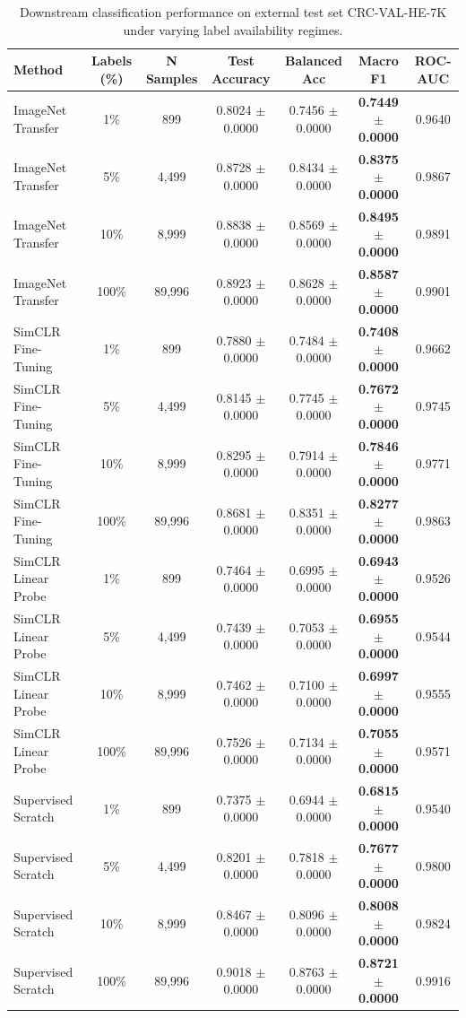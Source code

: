 \begin{table}[t]
\centering
\small
\caption{Downstream classification performance on external test set CRC-VAL-HE-7K under varying label availability regimes.}
\label{tab:downstream_results}
\begin{tabular}{lcccccc}
\toprule
\textbf{Method} & \textbf{Labels (\%)} & \textbf{N Samples} & \textbf{Test Accuracy} & \textbf{Balanced Acc} & \textbf{Macro F1} & \textbf{ROC-AUC} \\
\midrule
ImageNet Transfer & 1\% & 899 & 0.8024 $\pm$ 0.0000 & 0.7456 $\pm$ 0.0000 & \textbf{0.7449 $\pm$ 0.0000} & 0.9640 \\
ImageNet Transfer & 5\% & 4,499 & 0.8728 $\pm$ 0.0000 & 0.8434 $\pm$ 0.0000 & \textbf{0.8375 $\pm$ 0.0000} & 0.9867 \\
ImageNet Transfer & 10\% & 8,999 & 0.8838 $\pm$ 0.0000 & 0.8569 $\pm$ 0.0000 & \textbf{0.8495 $\pm$ 0.0000} & 0.9891 \\
ImageNet Transfer & 100\% & 89,996 & 0.8923 $\pm$ 0.0000 & 0.8628 $\pm$ 0.0000 & \textbf{0.8587 $\pm$ 0.0000} & 0.9901 \\
SimCLR Fine-Tuning & 1\% & 899 & 0.7880 $\pm$ 0.0000 & 0.7484 $\pm$ 0.0000 & \textbf{0.7408 $\pm$ 0.0000} & 0.9662 \\
SimCLR Fine-Tuning & 5\% & 4,499 & 0.8145 $\pm$ 0.0000 & 0.7745 $\pm$ 0.0000 & \textbf{0.7672 $\pm$ 0.0000} & 0.9745 \\
SimCLR Fine-Tuning & 10\% & 8,999 & 0.8295 $\pm$ 0.0000 & 0.7914 $\pm$ 0.0000 & \textbf{0.7846 $\pm$ 0.0000} & 0.9771 \\
SimCLR Fine-Tuning & 100\% & 89,996 & 0.8681 $\pm$ 0.0000 & 0.8351 $\pm$ 0.0000 & \textbf{0.8277 $\pm$ 0.0000} & 0.9863 \\
SimCLR Linear Probe & 1\% & 899 & 0.7464 $\pm$ 0.0000 & 0.6995 $\pm$ 0.0000 & \textbf{0.6943 $\pm$ 0.0000} & 0.9526 \\
SimCLR Linear Probe & 5\% & 4,499 & 0.7439 $\pm$ 0.0000 & 0.7053 $\pm$ 0.0000 & \textbf{0.6955 $\pm$ 0.0000} & 0.9544 \\
SimCLR Linear Probe & 10\% & 8,999 & 0.7462 $\pm$ 0.0000 & 0.7100 $\pm$ 0.0000 & \textbf{0.6997 $\pm$ 0.0000} & 0.9555 \\
SimCLR Linear Probe & 100\% & 89,996 & 0.7526 $\pm$ 0.0000 & 0.7134 $\pm$ 0.0000 & \textbf{0.7055 $\pm$ 0.0000} & 0.9571 \\
Supervised Scratch & 1\% & 899 & 0.7375 $\pm$ 0.0000 & 0.6944 $\pm$ 0.0000 & \textbf{0.6815 $\pm$ 0.0000} & 0.9540 \\
Supervised Scratch & 5\% & 4,499 & 0.8201 $\pm$ 0.0000 & 0.7818 $\pm$ 0.0000 & \textbf{0.7677 $\pm$ 0.0000} & 0.9800 \\
Supervised Scratch & 10\% & 8,999 & 0.8467 $\pm$ 0.0000 & 0.8096 $\pm$ 0.0000 & \textbf{0.8008 $\pm$ 0.0000} & 0.9824 \\
Supervised Scratch & 100\% & 89,996 & 0.9018 $\pm$ 0.0000 & 0.8763 $\pm$ 0.0000 & \textbf{0.8721 $\pm$ 0.0000} & 0.9916 \\
\bottomrule
\end{tabular}
\end{table}
